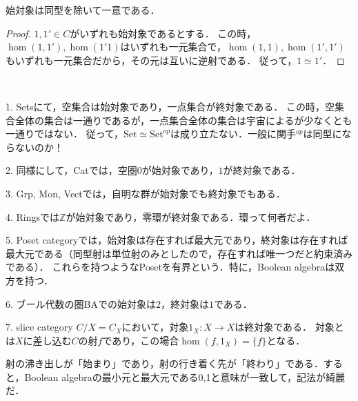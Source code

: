 \documentclass[uplatex, dvipdfmx]{jsarticle}
\begin{document}
\begin{proposition}
    始対象は同型を除いて一意である．
\end{proposition}
\begin{proof}
    $1,1'\in C$がいずれも始対象であるとする．
    この時，$\hom(1,1'),\hom(1'1)$はいずれも一元集合で，$\hom(1,1),\hom(1',1')$もいずれも一元集合だから，その元は互いに逆射である．
    従って，$1\simeq 1'$．
\end{proof}

\begin{example}　

    1. Setsにて，空集合は始対象であり，一点集合が終対象である．
    この時，空集合全体の集合は一通りであるが，一点集合全体の集合は宇宙によるが少なくとも一通りではない．
    従って，$\mathrm{Set}\simeq\mathrm{Set}^{op}$は成り立たない．一般に関手${}^{op}$は同型にならないのか！

    2. 同様にして，Catでは，空圏$0$が始対象であり，$1$が終対象である．

    3. Grp, Mon, Vectでは，自明な群が始対象でも終対象でもある．

    4. Ringsでは$\mathbb{Z}$が始対象であり，零環が終対象である．環って何者だよ．

    5. Poset categoryでは，始対象は存在すれば最大元であり，終対象は存在すれば最大元である（同型射は単位射のみとしたので，存在すれば唯一つだと約束済みである）．
    これらを持つようなPosetを有界という．特に，Boolean algebraは双方を持つ．

    6. ブール代数の圏BAでの始対象は$2$，終対象は$1$である．

    7. slice category $C/X=C_X$において，対象$1_X:X\to X$は終対象である．
    対象とは$X$に差し込む$C$の射$f$であり，この場合$\hom(f,1_X)=\{f\}$となる．
    \begin{center}
    \end{center}
\end{example}
\begin{remark*}
    射の沸き出しが「始まり」であり，射の行き着く先が「終わり」である．すると，Boolean algebraの最小元と最大元である0,1と意味が一致して，記法が綺麗だ．
\end{remark*}
\end{document}
